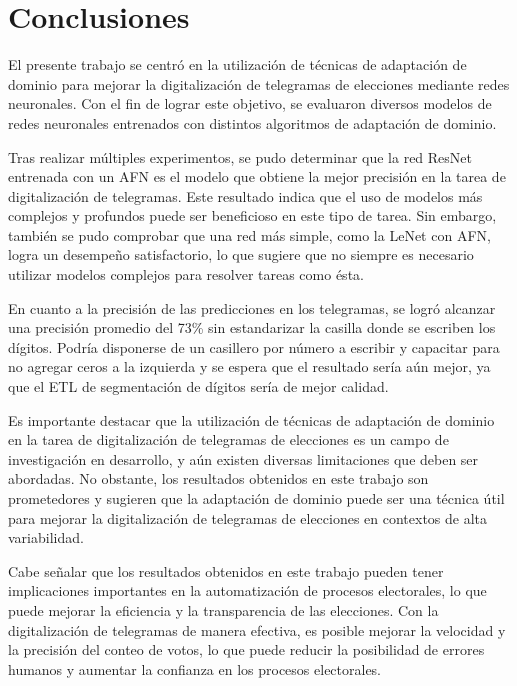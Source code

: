 \chapter{Conclusiones}

\label{Chapter5}

El presente trabajo se centró en la utilización de técnicas de adaptación de dominio para mejorar la digitalización de
telegramas de elecciones mediante redes neuronales. Con el fin de lograr este objetivo, se evaluaron diversos modelos
de redes neuronales entrenados con distintos algoritmos de adaptación de dominio.

Tras realizar múltiples experimentos, se pudo determinar que la red ResNet entrenada con un AFN es el modelo que
obtiene la mejor precisión en la tarea de digitalización de telegramas. Este resultado indica que el uso de modelos más
complejos y profundos puede ser beneficioso en este tipo de tarea. Sin embargo, también se pudo comprobar que una red
más simple, como la LeNet con AFN, logra un desempeño satisfactorio, lo que sugiere que no siempre es necesario
utilizar modelos complejos para resolver tareas como ésta.

En cuanto a la precisión de las predicciones en los telegramas, se logró alcanzar una precisión promedio del 73\% sin
estandarizar la casilla donde se escriben los dígitos. Podría disponerse de un casillero por número a escribir y
capacitar para no agregar ceros a la izquierda y se espera que el resultado sería aún mejor, ya que el ETL de
segmentación de dígitos sería de mejor calidad.

Es importante destacar que la utilización de técnicas de adaptación de dominio en la tarea de digitalización de
telegramas de elecciones es un campo de investigación en desarrollo, y aún existen diversas limitaciones que deben ser
abordadas. No obstante, los resultados obtenidos en este trabajo son prometedores y sugieren que la adaptación de
dominio puede ser una técnica útil para mejorar la digitalización de telegramas de elecciones en contextos de alta
variabilidad.

Cabe señalar que los resultados obtenidos en este trabajo pueden tener implicaciones importantes en la automatización
de procesos electorales, lo que puede mejorar la eficiencia y la transparencia de las elecciones. Con la digitalización
de telegramas de manera efectiva, es posible mejorar la velocidad y la precisión del conteo de votos, lo que puede
reducir la posibilidad de errores humanos y aumentar la confianza en los procesos electorales.

